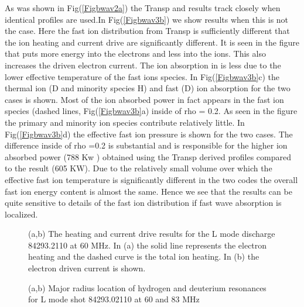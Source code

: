   As was shown in Fig(\ref{Figbwav2a}) the Transp and \ot results track
   closely when identical profiles are used.In Fig(\ref{Figbwav3b}) we
   show results when this is not the case. Here the fast ion 
   distribution from Transp is sufficiently different that the ion
  heating and current drive are significantly different. It is seen in
  the figure that \ot puts more energy into the electrons and less into
  the ions. This also increases the driven electron current. The ion
  absorption in \ot is less due to the lower effective temperature of
  the fast ions species. In Fig(\ref{Figbwav3b}c) the thermal ion (D and
  minority species H) and fast (D)  ion absorption
  for the two cases is shown. Most of the ion absorbed power in fact
  appears in the fast ion species (dashed lines, Fig(\ref{Figbwav3b}a)
  inside of rho = 0.2. As seen in the figure the primary and minority
  ion species contribute relatively little. In Fig(\ref{Figbwav3b}d) the
  effective fast ion pressure is shown for the two cases. The
  difference inside of rho =0.2 is substantial and is responsible for
  the higher ion absorbed power (788 Kw ) obtained using the Transp
  derived profiles compared to the \ot result (605 KW). Due to the
  relatively small volume over which the effective fast ion
  temperature is significantly different in the two codes  the overall
  fast ion energy content is almost the same. Hence we see that the
  \ct results can be quite sensitive to details of the fast ion
  distribution if fast wave absorption is localized.   




 \begin{figure}[hbt] %
 \centering  
\begin{narrow}{-0.40in}{0in}  
 \mbox{}
 \caption{(a,b) The heating and current drive results for the  L mode
   discharge 84293.2110  at 60 MHz. In (a) the solid line represents
   the electron heating and the dashed curve is the total ion heating.
   In (b) the electron driven current is shown.}
\end{narrow}
  \label{l16}
 \end{figure}

\begin{figure}[hbt] %
 \centering  
\begin{narrow}{-0.40in}{0in}  
 \mbox{}
 \caption{(a,b) Major radius location of hydrogen and deuterium
   resonances for L mode shot 84293.02110 at 60 and 83 MHz }
\end{narrow}
  \label{l17}
 \end{figure}

